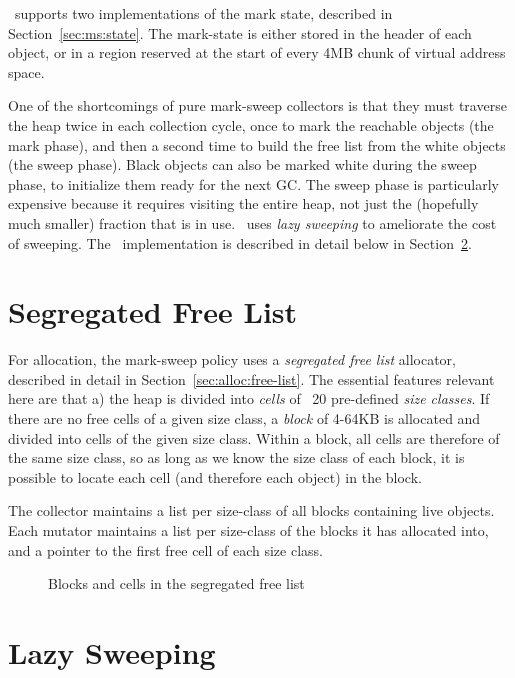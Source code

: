 \mmtk\ supports two implementations of the mark state, described in
Section~\ref{sec:ms:state}.  The mark-state is either stored in the header
of each object, or in a region reserved at the start of every 4MB chunk of
virtual address space.

One of the shortcomings of pure mark-sweep collectors is that they must traverse
the heap twice in each collection cycle, once to mark the reachable objects
(the mark phase), and then a second time to build the free list from the white
objects (the sweep phase).  
Black objects can also be marked white during the sweep phase, 
to initialize them ready for the next GC.
The sweep phase is particularly expensive because it requires visiting the
entire heap, not just the (hopefully much smaller) fraction that is in use.
\mmtk\ uses \emph{lazy sweeping} \citep{Hughes:82, Boehm:00} to ameliorate the
cost of sweeping.  The \mmtk\ implementation is described in detail below in
Section~\ref{sec:ms:lazy}.

\section{Segregated Free List}

For allocation, the mark-sweep policy uses a \emph{segregated free list}
allocator, described in detail in Section~\ref{sec:alloc:free-list}.  The
essential features relevant here are that a) the heap is divided into
\emph{cells} of ~20 pre-defined \emph{size classes}.  If there are no free cells
of a given size class, a \emph{block} of 4-64KB is allocated and divided into
cells of the given size class.  Within a block, all cells are therefore of the
same size class, so as long as we know the size class of each
block, it is possible to locate each cell (and therefore each object) in the block.

The collector maintains a list per size-class of all blocks containing live
objects.  Each mutator maintains a list per size-class of the blocks it has
allocated into, and a pointer to the first free cell of each size class.

\begin{figure}
\begin{center}
 
\end{center}
\caption{Blocks and cells in the segregated free list}
\end{figure}

\section{Lazy Sweeping}
\label{sec:ms:lazy}



